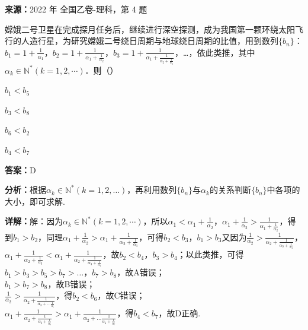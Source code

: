 \begin{question}[points=5]
\textbf{来源：}2022 年 全国乙卷-理科，第 4 题\par
嫦娥二号卫星在完成探月任务后，继续进行深空探测，成为我国第一颗环绕太阳飞行的人造行星，为研究嫦娥二号绕日周期与地球绕日周期的比值，用到数列$\{b_n\}$：$b_1 = 1 + \frac{1}{\alpha_1}$，$b_2 = 1 + \frac{1}{\alpha_1 + \frac{1}{\alpha_2}}$，$b_3 = 1 + \frac{1}{\alpha_1 + \frac{1}{\alpha_2 + \frac{1}{\alpha_3}}}$，…，依此类推，其中$\alpha_k \in \mathbb{N}^* (k = 1, 2, \cdots)$．则（\qquad）
\begin{choices}
  \item $b_1 < b_5$
  \item $b_3 < b_8$
  \item $b_6 < b_2$
  \item $b_4 < b_7$
\end{choices}
\begin{solution}
\textbf{答案：}D

\textbf{分析：}根据$\alpha_k \in \mathbb{N}^* (k = 1, 2, \dots)$，再利用数列$\{b_n\}$与$\alpha_k$的关系判断$\{b_n\}$中各项的大小，即可求解.

\textbf{详解：}解：因为$\alpha_k \in \mathbb{N}^* (k = 1, 2, \cdots)$，所以$\alpha_1 < \alpha_1 + \frac{1}{\alpha_2}$，$\alpha_1 + \frac{1}{\alpha_2} > \frac{1}{\alpha_1 + \frac{1}{\alpha_2}}$，得到$b_1 > b_2$，同理$\alpha_1 + \frac{1}{\alpha_2} > \alpha_1 + \frac{1}{\alpha_2 + \frac{1}{\alpha_3}}$，可得$b_2 < b_3$，$b_1 > b_3$又因为$\frac{1}{\alpha_2} > \frac{1}{\alpha_2 + \frac{1}{\alpha_3 + \frac{1}{\alpha_4}}}$，$\alpha_1 + \frac{1}{\alpha_2 + \frac{1}{\alpha_3}} < \alpha_1 + \frac{1}{\alpha_2 + \frac{1}{\alpha_3 + \frac{1}{\alpha_4}}}$，故$b_2 < b_4$，$b_3 > b_4$；以此类推，可得$b_1 > b_3 > b_5 > b_7 > \dots$，$b_7 > b_8$，故A错误；\\$b_1 > b_7 > b_8$，故B错误；\\$\frac{1}{\alpha_2} > \frac{1}{\alpha_2 + \frac{1}{\alpha_3 + \dots \frac{1}{\alpha_6}}}$，得$b_2 < b_6$，故C错误；\\$\alpha_1 + \frac{1}{\alpha_2 + \frac{1}{\alpha_3 + \frac{1}{\alpha_4}}} > \alpha_1 + \frac{1}{\alpha_2 + \dots \frac{1}{\alpha_6 + \frac{1}{\alpha_7}}}$，得$b_4 < b_7$，故D正确.
\end{solution}
\end{question}

